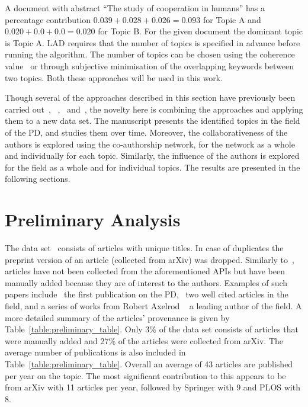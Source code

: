 \documentclass{article}
\theoremstyle{definition}
\newcommand{\totalarticles}{}
\newcommand{\manual}{}
\begin{document}
A document with abstract ``The study of cooperation in humans'' has a percentage
contribution \(0.039 + 0.028 + 0.026 = 0.093\) for Topic A and 
\(0.020 + 0.0 + 0.0 = 0.020\) for Topic B. For the given document the dominant
topic is Topic A.
LAD requires that the number of topics is specified in advance before running
the algorithm. The number of topics can be chosen using the coherence
value~\cite{Roder2015} or through subjective minimisation of the overlapping
keywords between two topics. Both these approaches will be used in this work.

Though several of the approaches described in this section have previously been
carried out~\cite{Bergmann2018}, ~\cite{Liu2015},~\cite{Sugimoto2011}
and~\cite{youngblood2018}, the novelty here is combining the approaches and applying them
to a new data set. The manuscript presents the identified topics in the field of the PD,
and studies them over time. Moreover, the collaborativeness of the authors is
explored using the co-authorship network, for the network as a whole and
individually for each topic. Similarly, the influence of the authors is explored
for the field as a whole and for individual topics. The results are presented in
the following sections.

\section{Preliminary Analysis}\label{section:results}

The data set~\cite{pd_data_2018} consists of \totalarticles articles with unique
titles. In case of duplicates the preprint version of an article (collected from
arXiv) was dropped. Similarly to~\cite{Liu2015}, \manual articles have not been
collected from the aforementioned APIs but have been manually added because they
are of interest to the authors. Examples of such papers include~\cite{Flood1958}
the first publication on the PD,~\cite{Ohtsuki2006, Stewart2012} two well cited
articles in the field, and a series of works from Robert Axelrod
~\cite{Axelrod1980, Axelrod1980more, Axelrod1987, Axelrod1981, Riolo2001} a
leading author of the field. A more detailed summary of the articles' provenance
is given by Table~\ref{table:preliminary_table}. Only 3\% of the data set consists of
articles that were manually added and 27\% of the articles were collected from
arXiv. The average number of publications is also included in
Table~\ref{table:preliminary_table}. Overall an average of 43 articles are published
per year on the topic. The most significant contribution to this appears to be
from arXiv with 11 articles per year, followed by Springer with 9 and PLOS with
8.
\end{document}
